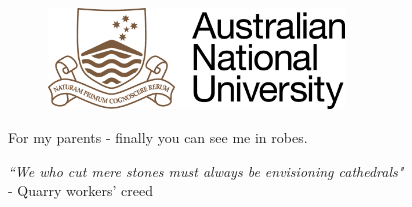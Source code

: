 \mbox{}
\begin{figure}[b]
\begin{center}
\includegraphics[width=0.7\textwidth]{fig/ANU_logo_temp}
\end{center}
\end{figure}





\newpage
\noindent\large{For my parents - finally you can see me in robes.}\newline
\mbox{}
\vfill
\begin{flushright}
\large{\emph{``We who cut mere stones must always be envisioning cathedrals"\\} 
- Quarry workers' creed}
\end{flushright}






\cleardoublepage
